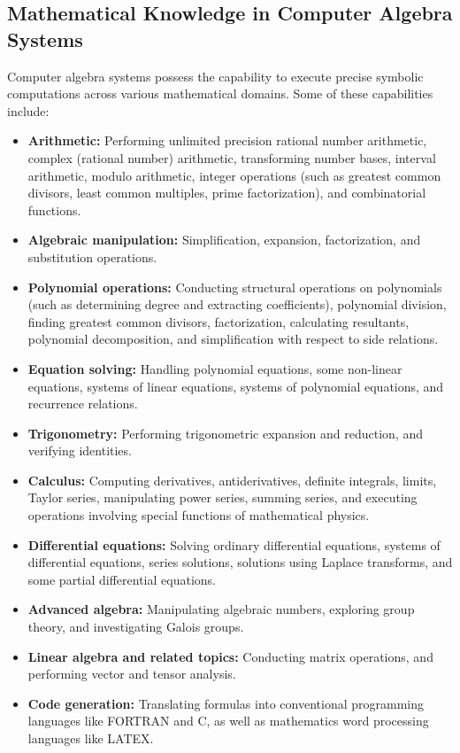 \subsection{Mathematical Knowledge in Computer Algebra Systems}

Computer algebra systems possess the capability to execute precise symbolic computations across various mathematical domains. Some of these capabilities include:
%
\begin{itemize}
  \item \textbf{Arithmetic:} Performing unlimited precision rational number arithmetic, complex (rational number) arithmetic, transforming number bases, interval arithmetic, modulo arithmetic, integer operations (such as greatest common divisors, least common multiples, prime factorization), and combinatorial functions.
  \item \textbf{Algebraic manipulation:} Simplification, expansion, factorization, and substitution operations.
  \item \textbf{Polynomial operations:} Conducting structural operations on polynomials (such as determining degree and extracting coefficients), polynomial division, finding greatest common divisors, factorization, calculating resultants, polynomial decomposition, and simplification with respect to side relations.
  \item \textbf{Equation solving:} Handling polynomial equations, some non-linear equations, systems of linear equations, systems of polynomial equations, and recurrence relations.
  \item \textbf{Trigonometry:} Performing trigonometric expansion and reduction, and verifying identities.
  \item \textbf{Calculus:} Computing derivatives, antiderivatives, definite integrals, limits, Taylor series, manipulating power series, summing series, and executing operations involving special functions of mathematical physics.
  \item \textbf{Differential equations:} Solving ordinary differential equations, systems of differential equations, series solutions, solutions using Laplace transforms, and some partial differential equations.
  \item \textbf{Advanced algebra:} Manipulating algebraic numbers, exploring group theory, and investigating Galois groups.
  \item \textbf{Linear algebra and related topics:} Conducting matrix operations, and performing vector and tensor analysis.
  \item \textbf{Code generation:} Translating formulas into conventional programming languages like FORTRAN and C, as well as mathematics word processing languages like LATEX.
\end{itemize}


